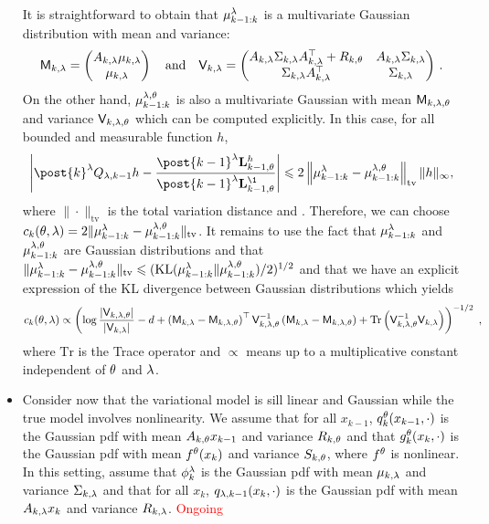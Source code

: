 \documentclass{article}
\begin{document}
\begin{itemize}
It is straightforward to obtain that $\mu_{k-1:k}^\lambda$ is a multivariate Gaussian distribution with mean and variance:
$$
\mathsf{M}_{k,\lambda} = \begin{pmatrix}A_{k,\lambda} \mu_{k,\lambda} \\ \mu_{k,\lambda}\end{pmatrix}\quad\mathrm{and}\quad \mathsf{V}_{k,\lambda} =\begin{pmatrix} A_{k,\lambda} \Sigma_{k,\lambda}A_{k,\lambda}^\top + R_{k,\theta}&  A_{k,\lambda} \Sigma_{k,\lambda}\\  \Sigma_{k,\lambda}A_{k,\lambda}^\top& \Sigma_{k,\lambda} \end{pmatrix}\,.
$$
On the other hand, $\mu_{k-1:k}^{\lambda,\theta}$ is also a multivariate Gaussian with mean $\mathsf{M}_{k,\lambda,\theta}$ and variance $ \mathsf{V}_{k,\lambda,\theta}$ which can be computed explicitly. In this case, for all bounded and measurable function $h$,
$$
\left|\post{k}^{\parvar}Q_{\parvar,k-1} h - \frac{\post{k-1}^{\parvar} \uk{k-1,\parvec}h}{\post{k-1}^{\parvar} \uk{k-1,\parvec}\1}\right| \leqslant 2 \left\|\mu_{k-1:k}^\parvar - \mu_{k-1:k}^{\parvar,\parvec}\right\|_{\mathrm{tv}} \| h \|_\infty,
$$ 
where $\|\cdot\|_{\mathrm{tv}}$ is the total variation distance and . Therefore, we can choose $c_k(\theta,\lambda) = 2 \|\mu_{k-1:k}^\lambda - \mu_{k-1:k}^{\lambda,\theta}\|_{\mathrm{tv}}$. It remains to use the fact that $\mu_{k-1:k}^\lambda$  and $\mu_{k-1:k}^{\lambda,\theta}$ are Gaussian distributions and that $\|\mu_{k-1:k}^\lambda - \mu_{k-1:k}^{\lambda,\theta}\|_{\mathrm{tv}} \leqslant (\mathrm{KL}(\mu_{k-1:k}^\lambda \| \mu_{k-1:k}^{\lambda,\theta})/2)^{1/2}$ and that we have an explicit expression of the $\mathrm{KL}$ divergence between Gaussian  distributions which yields
$$
c_k(\theta,\lambda) \propto \left(\log \frac{\left| \mathsf{V}_{k,\lambda,\theta}\right|}{\left| \mathsf{V}_{k,\lambda}\right|} - d + \left(\mathsf{M}_{k,\lambda} - \mathsf{M}_{k,\lambda,\theta}\right)^\top\mathsf{V}_{k,\lambda,\theta}^{-1}\left(\mathsf{M}_{k,\lambda} - \mathsf{M}_{k,\lambda,\theta}\right) + \mathrm{Tr}\left( \mathsf{V}_{k,\lambda,\theta}^{-1}\mathsf{V}_{k,\lambda}\right)\right)^{-1/2}\;,
$$
where $ \mathrm{Tr}$ is the Trace operator and $\propto$ means up to a multiplicative constant independent of $\theta$ and $\lambda$.
\item Consider now that the variational model is sill linear and Gaussian while the true model involves nonlinearity. We assume that for all $x_{k-1}$, $q_{k}^{\theta}(x_{k-1}, \cdot)$ is the Gaussian pdf with mean $A_{k,\theta} x_{k-1}$ and variance $R_{k,\theta}$  and that $g_{k}^{\theta}(x_{k},\cdot)$ is the Gaussian pdf with mean $f^\theta(x_k)$ and variance $S_{k,\theta}$, where $f^\theta$ is nonlinear. In this setting, assume that $\phi_k^\lambda$ is the Gaussian pdf with mean $\mu_{k,\lambda}$ and variance $\Sigma_{k,\lambda}$ and that for all $x_k$, $q_{\lambda,k-1}(x_{k}, \cdot)$ is the Gaussian pdf with mean $A_{k,\lambda} x_k$ and variance $R_{k,\lambda}$. \textcolor{red}{Ongoing} 
\end{itemize}
\end{document}
